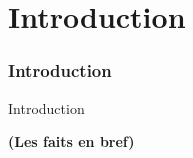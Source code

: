 %

\section{Introduction}
\begin{frame}[fragile]
	\frametitle{Introduction}

	\begin{center}\huge{Introduction}\end{center}
	\begin{center}\huge{\color{typo3darkgrey}\textbf{(Les faits en bref)}}\end{center}

\end{frame}



